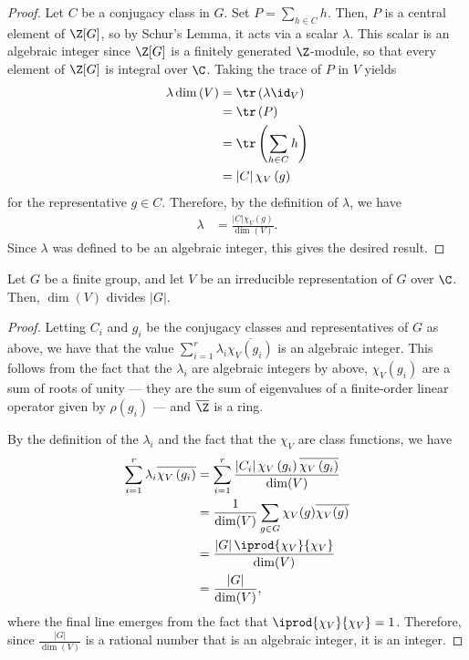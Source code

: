 \documentclass[10pt]{mypackage}
\begin{document}
\begin{proof}
  Let $C$ be a conjugacy class in $G$. Set $P = \sum_{h\in C} h$. Then, $P$ is a central element of $\Z[G]$, so by Schur's Lemma, it acts via a scalar $\lambda$. This scalar is an algebraic integer since $\Z[G]$ is a finitely generated $\Z$-module, so that every element of $\Z[G]$ is integral over $\C$. Taking the trace of $P$ in $V$ yields
  \begin{align*}
    \lambda \dim\left( V \right) &= \tr\left( \lambda \id_V \right)\\
                                 &= \tr\left( P \right)\\
                                 &= \tr\left( \sum_{h\in C} h \right)\\
                                 &= \left\vert C \right\vert\chi_V\left( g \right)
  \end{align*}
  for the representative $g\in C$. Therefore, by the definition of $\lambda$, we have
  \begin{align*}
    \lambda &= \frac{\left\vert C \right\vert \chi_V(g)}{\dim\left( V \right)}.
  \end{align*}
  Since $\lambda$ was defined to be an algebraic integer, this gives the desired result.
\end{proof}
\begin{theorem}
  Let $G$ be a finite group, and let $V$ be an irreducible representation of $G$ over $\C$. Then, $\dim(V)$ divides $ \left\vert G \right\vert $.
\end{theorem}
\begin{proof}
  Letting $C_i$ and $g_i$ be the conjugacy classes and representatives of $G$ as above, we have that the value $\sum_{i=1}^{r}\lambda_i \overline{\chi_V\left(g_i\right)}$ is an algebraic integer. This follows from the fact that the $\lambda_i$ are algebraic integers by above, $\chi_V\left( g_i \right)$ are a sum of roots of unity --- they are the sum of eigenvalues of a finite-order linear operator given by $\rho\left(g_i\right)$ --- and $ \overline{\Z} $ is a ring.

  By the definition of the $\lambda_i$ and the fact that the $\chi_V$ are class functions, we have
  \begin{align*}
    \sum_{i=1}^{r} \lambda_i \overline{\chi_V\left( g_i \right)} &= \sum_{i=1}^{r} \frac{\left\vert C_i \right\vert \chi_V\left( g_i \right) \overline{\chi_V\left( g_i \right)}}{\dim(V)}\\
                                                                 &= \frac{1}{\dim(V)} \sum_{g\in G} \chi_V(g) \overline{\chi_V(g)}\\
                                                                 &= \frac{\left\vert G \right\vert \iprod{\chi_V}{\chi_V}}{\dim(V)}\\
                                                                 &= \frac{\left\vert G \right\vert}{\dim(V)},
  \end{align*}
  where the final line emerges from the fact that $ \iprod{\chi_V}{\chi_V} = 1 $. Therefore, since $\frac{\left\vert G \right\vert}{\dim(V)}$ is a rational number that is an algebraic integer, it is an integer.
\end{proof}
\end{document}
